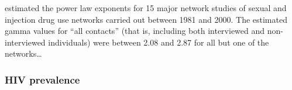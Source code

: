 \textcite{rothenberg2007large} estimated the power law exponents for 15 major
network studies of sexual and injection drug use networks carried out between
1981 and 2000. The estimated \gls{gamma} values for ``all contacts'' (that is,
including both interviewed and non-interviewed individuals) were 
between 2.08 and 2.87 for all but one of the networks\ldots


\subsubsection{HIV prevalence}

